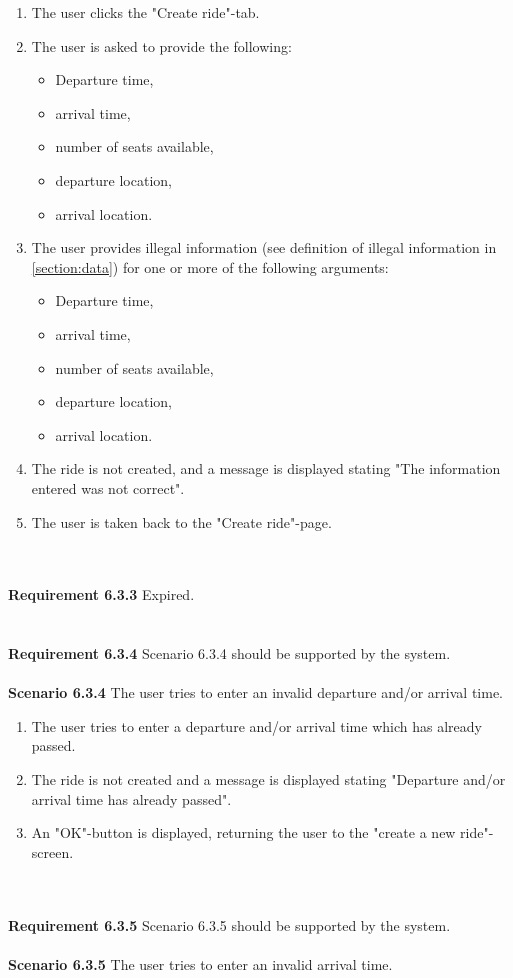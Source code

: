 \documentclass{article}
\begin{document}
\begin{enumerate}
    \item The user clicks the "Create ride"-tab.
    \item The user is asked to provide the following:
        \begin{itemize}
            \item Departure time,
            \item arrival time, 
            \item number of seats available, 
            \item departure location,
            \item arrival location. 
        \end{itemize}
    \item The user provides illegal information (see definition of illegal information in \ref{section:data})  for one or more of the following arguments:
            \begin{itemize}
            \item Departure time,
            \item arrival time, 
            \item number of seats available, 
            \item departure location,
            \item arrival location. 
        \end{itemize}
    \item The ride is not created, and a message is displayed stating "The information entered was not correct".  
    \item The user is taken back to the "Create ride"-page.
    
\end{enumerate}
\mbox{}\\ \\
\textbf{Requirement 6.3.3} Expired. \\
\mbox{}\\ \\
\textbf{Requirement 6.3.4} Scenario 6.3.4 should be supported by the system.
\\ \\
\textbf{Scenario 6.3.4} The user tries to enter an invalid departure and/or arrival time.

\begin{enumerate}
    \item The user tries to enter a departure and/or arrival time which has already passed.
    \item The ride is not created and a message is displayed stating "Departure and/or arrival time has already passed".
    \item An "OK"-button is displayed, returning the user to the "create a new ride"-screen.
\end{enumerate}
\mbox{}\\ \\
\textbf{Requirement 6.3.5} Scenario 6.3.5 should be supported by the system.
\\ \\
\textbf{Scenario 6.3.5} The user tries to enter an invalid arrival time.
\end{document}
